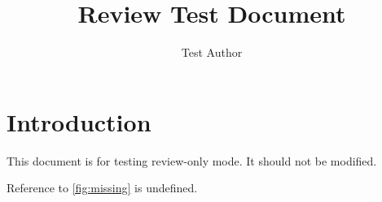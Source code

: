 \documentclass{article}
\title{Review Test Document}
\author{Test Author}
\begin{document}
\maketitle

\section{Introduction}

This document is for testing review-only mode. It should not be modified.

Reference to \ref{fig:missing} is undefined.
\end{document}
